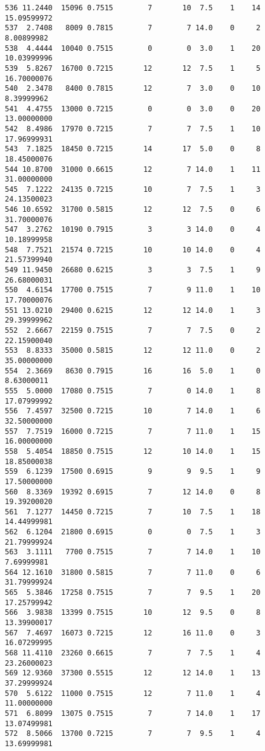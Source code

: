 \documentclass[
  letterpaper,
  DIV=11,
  numbers=noendperiod]{scrreprt}
\begin{document}
\begin{verbatim}
536 11.2440  15096 0.7515        7       10  7.5    1    14 15.09599972
537  2.7408   8009 0.7815        7        7 14.0    0     2  8.00899982
538  4.4444  10040 0.7515        0        0  3.0    1    20 10.03999996
539  5.8267  16700 0.7215       12       12  7.5    1     5 16.70000076
540  2.3478   8400 0.7815       12        7  3.0    0    10  8.39999962
541  4.4755  13000 0.7215        0        0  3.0    0    20 13.00000000
542  8.4986  17970 0.7215        7        7  7.5    1    10 17.96999931
543  7.1825  18450 0.7215       14       17  5.0    0     8 18.45000076
544 10.8700  31000 0.6615       12        7 14.0    1    11 31.00000000
545  7.1222  24135 0.7215       10        7  7.5    1     3 24.13500023
546 10.6592  31700 0.5815       12       12  7.5    0     6 31.70000076
547  3.2762  10190 0.7915        3        3 14.0    0     4 10.18999958
548  7.7521  21574 0.7215       10       10 14.0    0     4 21.57399940
549 11.9450  26680 0.6215        3        3  7.5    1     9 26.68000031
550  4.6154  17700 0.7515        7        9 11.0    1    10 17.70000076
551 13.0210  29400 0.6215       12       12 14.0    1     3 29.39999962
552  2.6667  22159 0.7515        7        7  7.5    0     2 22.15900040
553  8.8333  35000 0.5815       12       12 11.0    0     2 35.00000000
554  2.3669   8630 0.7915       16       16  5.0    1     0  8.63000011
555  5.0000  17080 0.7515        7        0 14.0    1     8 17.07999992
556  7.4597  32500 0.7215       10        7 14.0    1     6 32.50000000
557  7.7519  16000 0.7215        7        7 11.0    1    15 16.00000000
558  5.4054  18850 0.7515       12       10 14.0    1    15 18.85000038
559  6.1239  17500 0.6915        9        9  9.5    1     9 17.50000000
560  8.3369  19392 0.6915        7       12 14.0    0     8 19.39200020
561  7.1277  14450 0.7215        7       10  7.5    1    18 14.44999981
562  6.1204  21800 0.6915        0        0  7.5    1     3 21.79999924
563  3.1111   7700 0.7515        7        7 14.0    1    10  7.69999981
564 12.1610  31800 0.5815        7        7 11.0    0     6 31.79999924
565  5.3846  17258 0.7515        7        7  9.5    1    20 17.25799942
566  3.9838  13399 0.7515       10       12  9.5    0     8 13.39900017
567  7.4697  16073 0.7215       12       16 11.0    0     3 16.07299995
568 11.4110  23260 0.6615        7        7  7.5    1     4 23.26000023
569 12.9360  37300 0.5515       12       12 14.0    1    13 37.29999924
570  5.6122  11000 0.7515       12        7 11.0    1     4 11.00000000
571  6.8099  13075 0.7515        7        7 14.0    1    17 13.07499981
572  8.5066  13700 0.7215        7        7  9.5    1     4 13.69999981

\end{verbatim}
\end{document}
